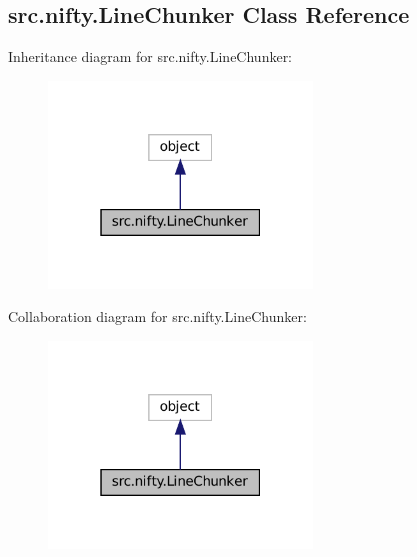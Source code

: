 \hypertarget{classsrc_1_1nifty_1_1LineChunker}{}\subsection{src.\+nifty.\+Line\+Chunker Class Reference}
\label{classsrc_1_1nifty_1_1LineChunker}


Inheritance diagram for src.\+nifty.\+Line\+Chunker\+:
\nopagebreak
\begin{figure}[H]
\begin{center}
\leavevmode
\includegraphics[width=199pt]{classsrc_1_1nifty_1_1LineChunker__inherit__graph}
\end{center}
\end{figure}


Collaboration diagram for src.\+nifty.\+Line\+Chunker\+:
\nopagebreak
\begin{figure}[H]
\begin{center}
\leavevmode
\includegraphics[width=199pt]{classsrc_1_1nifty_1_1LineChunker__coll__graph}
\end{center}
\end{figure}

